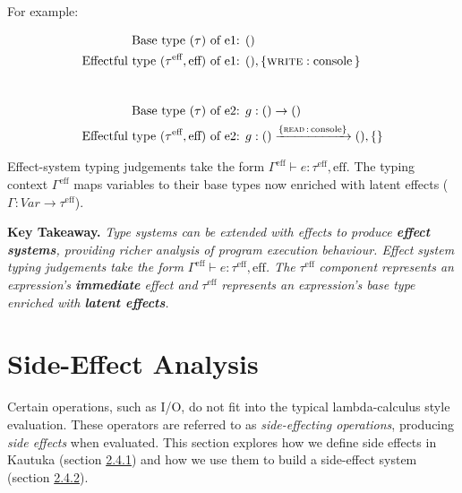 For example:

\vspace{1mm}

\begin{align*}
  \text{Base type } (\tau) \text{ of e1: }                                 & ()                                                                        \\
  \text{Effectful type } (\tau^\textrm{eff}, \textrm{eff}) \text{ of e1: } & (), \{ \textsc{write} : \text{console} \, \}                            \\
  \\[1em]
  \text{Base type } (\tau) \text{ of e2: }                                 & g: () \rightarrow ()                                                      \\
  \text{Effectful type } (\tau^\textrm{eff}, \textrm{eff}) \text{ of e2: } & g: () \xrightarrow{\{ \textsc{read} \, : \, \text{console} \}} (), \{\} \\
\end{align*}

\vspace{-2mm}

Effect-system typing judgements take the form \( \Gamma^\textrm{eff} \vdash e : \tau^\textrm{eff}, \textrm{eff} \). The typing context \( \Gamma^\textrm{eff} \) maps variables to their base types now enriched with latent effects (\( \Gamma : \textit{Var} \rightarrow \tau^\textrm{eff} \)).

\textbf{Key Takeaway.} \textit{Type systems can be extended with effects to produce \textbf{effect systems}, providing richer analysis of program execution behaviour. Effect system typing judgements take the form} \( \Gamma^\textrm{eff} \vdash e : \tau^\textrm{eff}, \textrm{eff}\)\textit{. The} \( \tau^\textrm{eff} \) \textit{component represents an expression's \textbf{immediate} effect and} \( \tau^\textrm{eff} \) \textit{represents an expression's base type enriched with \textbf{latent effects}.}

\section{Side-Effect Analysis}

Certain operations, such as I/O, do not fit into the typical lambda-calculus style evaluation. These operators are referred to as \textit{side-effecting operations}, producing \textit{side effects} when evaluated. This section explores how we define side effects in Kautuka (section \hyperref[sec:2.4.1]{2.4.1}) and how we use them to build a side-effect system (section \hyperref[sec:2.4.2]{2.4.2}).

